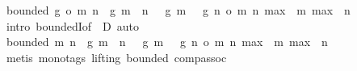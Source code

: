\begin{isabellebody}
\ {\isachardoublequoteopen}bounded\ {\isacharparenleft}{\kern0pt}g\ o\ {\isacharparenleft}{\kern0pt}{\isasymlambda}{\isacharparenleft}{\kern0pt}m{\isacharcomma}{\kern0pt}\ n{\isacharparenright}{\kern0pt}{\isachardot}{\kern0pt}\ {\isacharquery}{\kern0pt}{\isasymphi}\ g\ {\isacharparenleft}{\kern0pt}m\ {\isacharplus}{\kern0pt}\ n{\isacharparenright}{\kern0pt}\ {\isacharminus}{\kern0pt}\ {\isacharparenleft}{\kern0pt}{\isacharquery}{\kern0pt}{\isasymphi}\ g\ m\ {\isacharplus}{\kern0pt}\ {\isacharquery}{\kern0pt}{\isasymphi}\ g\ n{\isacharparenright}{\kern0pt}{\isacharparenright}{\kern0pt}\ o\ {\isacharparenleft}{\kern0pt}{\isasymlambda}{\isacharparenleft}{\kern0pt}m{\isacharcomma}{\kern0pt}\ n{\isacharparenright}{\kern0pt}{\isachardot}{\kern0pt}\ {\isacharparenleft}{\kern0pt}max\ {}\ m{\isacharcomma}{\kern0pt}\ max\ {}\ n{\isacharparenright}{\kern0pt}{\isacharparenright}{\kern0pt}{\isacharparenright}{\kern0pt}{\isachardoublequoteclose}\ \isamarkupfalse%
\ {\isacharparenleft}{\kern0pt}intro\ boundedI{\isacharbrackleft}{\kern0pt}of\ {\isacharunderscore}{\kern0pt}\ D{\isacharbrackright}{\kern0pt}{\isacharparenright}{\kern0pt}\ auto\isanewline
\ \ \isamarkupfalse%
\ {\isachardoublequoteopen}bounded\ {\isacharparenleft}{\kern0pt}{\isacharparenleft}{\kern0pt}{\isasymlambda}{\isacharparenleft}{\kern0pt}m{\isacharcomma}{\kern0pt}\ n{\isacharparenright}{\kern0pt}{\isachardot}{\kern0pt}\ {\isacharquery}{\kern0pt}{\isasymphi}\ g\ {\isacharparenleft}{\kern0pt}m\ {\isacharplus}{\kern0pt}\ n{\isacharparenright}{\kern0pt}\ {\isacharminus}{\kern0pt}\ {\isacharparenleft}{\kern0pt}{\isacharquery}{\kern0pt}{\isasymphi}\ g\ m\ {\isacharplus}{\kern0pt}\ {\isacharquery}{\kern0pt}{\isasymphi}\ g\ n{\isacharparenright}{\kern0pt}{\isacharparenright}{\kern0pt}\ o\ {\isacharparenleft}{\kern0pt}{\isasymlambda}{\isacharparenleft}{\kern0pt}m{\isacharcomma}{\kern0pt}\ n{\isacharparenright}{\kern0pt}{\isachardot}{\kern0pt}\ {\isacharparenleft}{\kern0pt}max\ {}\ m{\isacharcomma}{\kern0pt}\ max\ {}\ n{\isacharparenright}{\kern0pt}{\isacharparenright}{\kern0pt}{\isacharparenright}{\kern0pt}{\isachardoublequoteclose}\ \isamarkupfalse%
\ {\isacharparenleft}{\kern0pt}metis\ {\isacharparenleft}{\kern0pt}mono{\isacharunderscore}{\kern0pt}tags{\isacharcomma}{\kern0pt}\ lifting{\isacharparenright}{\kern0pt}\ bounded\ comp{\isacharunderscore}{\kern0pt}assoc{\isacharparenright}{\kern0pt}\isanewline
\ \ \isamarkupfalse%
\ \isamarkupfalse%

\end{isabellebody}
